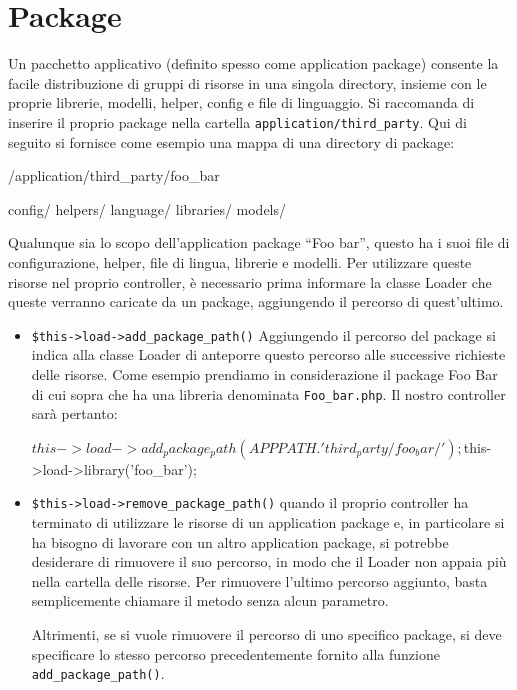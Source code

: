 \section*{Package}
Un pacchetto applicativo (definito spesso come application package) consente la facile distribuzione di gruppi di risorse in una singola directory, insieme con le proprie librerie, modelli, helper, config e file di linguaggio. Si raccomanda di inserire il proprio package nella cartella \verb|application/third_party|. Qui di seguito si fornisce come esempio una mappa di una directory di package:

\begin{code}
/application/third_party/foo_bar

config/
helpers/
language/
libraries/
models/
\end{code}

Qualunque sia lo scopo dell'application package ``Foo bar'', questo ha i suoi file di configurazione, helper, file di lingua, librerie e modelli. Per utilizzare queste risorse nel proprio controller, è necessario prima informare la classe Loader che queste verranno caricate da un package, aggiungendo il percorso di quest'ultimo.

\begin{itemize}
\item \verb|$this->load->add_package_path()| Aggiungendo il percorso del package si indica alla classe Loader di anteporre questo percorso alle successive richieste delle risorse. Come esempio prendiamo in considerazione il package Foo Bar di cui sopra che ha una libreria denominata \verb|Foo_bar.php|. Il nostro controller sarà pertanto:

\begin{code}
$this->load->add_package_path(APPPATH.'third_party/foo_bar/');
$this->load->library('foo_bar');
\end{code}

\item \verb|$this->load->remove_package_path()| quando il proprio controller ha terminato di utilizzare le risorse di un application package e, in particolare si ha bisogno di lavorare con un altro application package, si potrebbe desiderare di rimuovere il suo percorso, in modo che il Loader non appaia più nella cartella delle risorse. Per rimuovere l'ultimo percorso aggiunto, basta semplicemente chiamare il metodo senza alcun parametro.

Altrimenti, se si vuole rimuovere il percorso di uno specifico package, si deve specificare lo stesso percorso precedentemente fornito alla funzione \verb|add_package_path()|.

\end{itemize}

